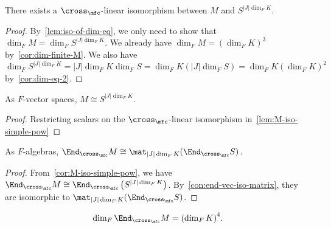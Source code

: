 \begin{lemma}\label{lem:M-iso-simple-pow}
  There exists a $\cross_{\mfc}$-linear isomorphism between $M$ and $S^{|J|\dim_{F}K}$.
  \leanok
\end{lemma}

\begin{proof}
  By~\cref{lem:iso-of-dim-eq}, we only need to show that $\dim_{F}M = \dim_{F}S^{|J|\dim_{F}K}$. We already have $\dim_{F}M = \left(\dim_{F}K\right)^{3}$ by~\cref{cor:dim-finite-M}. We also have $\dim_{F}S^{|J|\dim_{F}K} = |J|\dim_{F}K\dim_{F}S = \dim_{F}K \left(|J|\dim_{F}S\right) = \dim_{F}K\left(\dim_{F}K\right)^{2}$ by~\cref{cor:dim-eq-2}.
\end{proof}

\begin{corollary}\label{cor:M-iso-simple-pow}
  As $F$-vector spaces, $M \cong S^{|J|\dim_{F}K}$.
  \leanok
\end{corollary}
\begin{proof}
  Restricting scalars on the $\cross_{\mfc}$-linear isomorphism in~\cref{lem:M-iso-simple-pow}
\end{proof}

\begin{corollary}\label{cor:end-M-iso-mat}
  As $F$-algebras, $\End_{\cross_{\mfc}}M \cong \mat_{|J|\dim_{F}K}(\End_{\cross_{\mfc}}S)$.
  \leanok
\end{corollary}
\begin{proof}
  From~\cref{cor:M-iso-simple-pow}, we have $\End_{\cross_{\mfc}}M\cong \End_{\cross_{\mfc}}\left(S^{|J|\dim_{F}K}\right)$. By~\cref{con:end-vec-iso-matrix}, they are isomorphic to $\mat_{|J|\dim_{F}K}(\End_{\cross_{\mfc}}S)$.
\end{proof}

\begin{corollary}\label{cor:dim-eq-3}
  \[
    \dim_{F}\End_{\cross_{\mfc}}M = {\left(\dim_{F}K\right)}^{4}.
  \]
  \leanok
\end{corollary}

